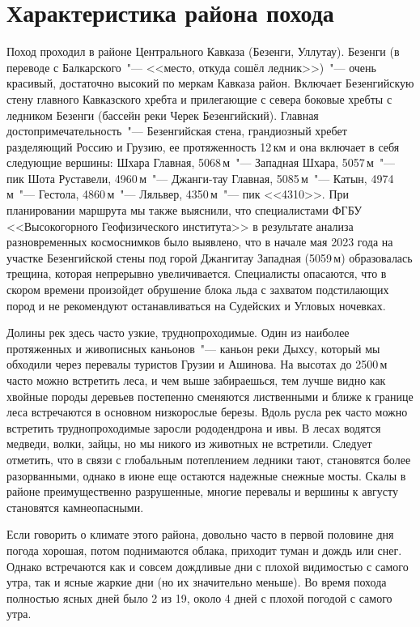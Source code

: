 \section{Характеристика района похода}\label{sec:characteristics_of_area}
    Поход проходил в районе Центрального Кавказа (Безенги, Уллутау). Безенги (в переводе с Балкарского~"---
    <<место, откуда сошёл ледник>>)~"--- очень красивый, достаточно высокий по меркам Кавказа район. Включает
    Безенгийскую стену главного Кавказского хребта и прилегающие с севера боковые хребты с ледником Безенги
    (бассейн реки Черек Безенгийский). Главная достопримечательность~"--- Безенгийская стена, грандиозный хребет
    разделяющий Россию и Грузию, ее протяженность 12\,км и она включает в себя следующие вершины: Шхара Главная,
    5068\,м~"--- Западная Шхара, 5057\,м~"--- пик Шота Руставели, 4960\,м~"--- Джанги-тау Главная, 5085\,м~"---
    Катын, 4974\,м~"--- Гестола, 4860\,м~"--- Ляльвер, 4350\,м~"--- пик <<4310>>. При планировании маршрута мы
    также выяснили, что специалистами ФГБУ <<Высокогорного Геофизического института>> в результате анализа
    разновременных космоснимков было выявлено, что в начале мая 2023 года на участке Безенгийской стены под горой
    Джангитау Западная (5059\,м) образовалась трещина, которая непрерывно увеличивается. Специалисты опасаются, что
    в скором времени произойдет обрушение блока льда с захватом подстилающих пород и не рекомендуют останавливаться
    на Судейских и Угловых ночевках.

    Долины рек здесь часто узкие, труднопроходимые. Один из наиболее протяженных и живописных каньонов~"--- каньон реки
    Дыхсу, который мы обходили через перевалы туристов Грузии и Ашинова. На высотах до 2500\,м часто можно встретить леса,
    и чем выше забираешься, тем лучше видно как хвойные породы деревьев постепенно сменяются лиственными и ближе к границе
    леса встречаются в основном низкорослые березы. Вдоль русла рек часто можно встретить труднопроходимые заросли рододендрона
    и ивы. В лесах водятся медведи, волки, зайцы, но мы никого из животных не встретили. Следует отметить, что в связи с
    глобальным потеплением ледники тают, становятся более разорванными, однако в июне еще остаются надежные снежные мосты.
    Скалы в районе преимущественно разрушенные, многие перевалы и вершины к августу становятся камнеопасными. 

    Если говорить о климате этого района, довольно часто в первой половине дня погода хорошая, потом поднимаются облака,
    приходит туман и дождь или снег. Однако встречаются как и совсем дождливые дни с плохой видимостью с самого утра, так
    и ясные жаркие дни (но их значительно меньше). Во время похода полностью ясных дней было 2 из 19, около 4 дней с плохой
    погодой с самого утра.

